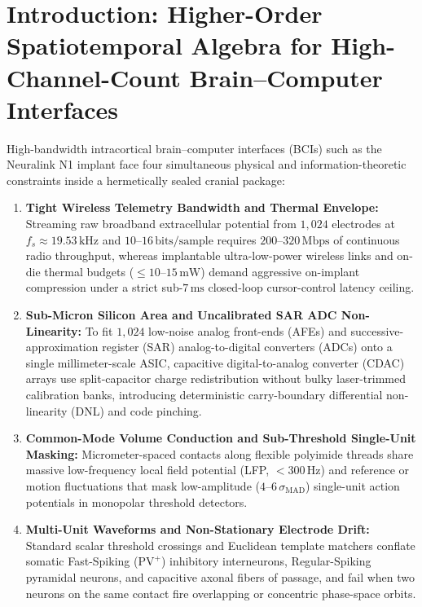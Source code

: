 \documentclass[11pt,letterpaper]{article}
\theoremstyle{definition}
\begin{document}
\vspace{0.5em}
\tableofcontents
\newpage

\section[Introduction: Spatiotemporal Algebra for High-Channel BCIs]{Introduction: Higher-Order Spatiotemporal Algebra for High-Channel-Count Brain--Computer Interfaces}

High-bandwidth intracortical brain--computer interfaces (BCIs) such as the Neuralink N1 implant face four simultaneous physical and information-theoretic constraints inside a hermetically sealed cranial package:
\begin{enumerate}
  \item \textbf{Tight Wireless Telemetry Bandwidth and Thermal Envelope:} Streaming raw broadband extracellular potential from $1{,}024$ electrodes at $f_s \approx 19.53\,\text{kHz}$ and $10\text{--}16\,\text{bits/sample}$ requires $200\text{--}320\,\text{Mbps}$ of continuous radio throughput, whereas implantable ultra-low-power wireless links and on-die thermal budgets ($\le 10\text{--}15\,\text{mW}$) demand aggressive on-implant compression under a strict sub-$7\,\text{ms}$ closed-loop cursor-control latency ceiling.
  \item \textbf{Sub-Micron Silicon Area and Uncalibrated SAR ADC Non-Linearity:} To fit $1{,}024$ low-noise analog front-ends (AFEs) and successive-approximation register (SAR) analog-to-digital converters (ADCs) onto a single millimeter-scale ASIC, capacitive digital-to-analog converter (CDAC) arrays use split-capacitor charge redistribution without bulky laser-trimmed calibration banks, introducing deterministic carry-boundary differential non-linearity (DNL) and code pinching.
  \item \textbf{Common-Mode Volume Conduction and Sub-Threshold Single-Unit Masking:} Micrometer-spaced contacts along flexible polyimide threads share massive low-frequency local field potential (LFP, $< 300\,\text{Hz}$) and reference or motion fluctuations that mask low-amplitude ($4\text{--}6\,\sigma_{\mathrm{MAD}}$) single-unit action potentials in monopolar threshold detectors.
  \item \textbf{Multi-Unit Waveforms and Non-Stationary Electrode Drift:} Standard scalar threshold crossings and Euclidean template matchers conflate somatic Fast-Spiking ($\text{PV}^+$) inhibitory interneurons, Regular-Spiking pyramidal neurons, and capacitive axonal fibers of passage, and fail when two neurons on the same contact fire overlapping or concentric phase-space orbits.
\end{enumerate}
\end{document}
